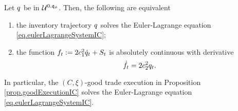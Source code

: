 \documentclass[10pt,a4paper]{article}
\begin{document}
\begin{lemma}
\label{lemma.characterisationEulerLagrangeIC}
Let $q$ be in $\mathcal{U}^{0,\mathfrak{q_0}}$. Then, the following are equivalent
\begin{enumerate}
	\item the inventory trajectory $q$ solves the Euler-Lagrange equation \eqref{eq.eulerLagrangeSystemIC};
	\item the function $f_t:= 2c_{1}^{2} \dot{q}_t + S_t$ is absolutely continuous with derivative 
	\begin{equation*}
	\dot{f}_t = 2 c_{2}^{2} q_t. 
	\end{equation*}
\end{enumerate}
In particular, the $(C,\xi)$-good trade execution in Proposition \ref{prop.goodExecutionIC} solves the Euler-Lagrange equation \eqref{eq.eulerLagrangeSystemIC}. 
\end{lemma}
\end{document}
